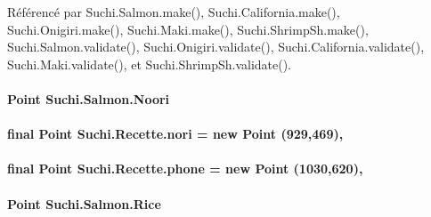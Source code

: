 Référencé par Suchi.\+Salmon.\+make(), Suchi.\+California.\+make(), Suchi.\+Onigiri.\+make(), Suchi.\+Maki.\+make(), Suchi.\+Shrimp\+Sh.\+make(), Suchi.\+Salmon.\+validate(), Suchi.\+Onigiri.\+validate(), Suchi.\+California.\+validate(), Suchi.\+Maki.\+validate(), et Suchi.\+Shrimp\+Sh.\+validate().

\hypertarget{classSuchi_1_1Salmon_a41f02127a7177e0edda113bd3e61e0b5}{}
\paragraph[{Noori}]{\setlength{\rightskip}{0pt plus 5cm}Point Suchi.\+Salmon.\+Noori\hspace{0.3cm}{\ttfamily [package]}}\label{classSuchi_1_1Salmon_a41f02127a7177e0edda113bd3e61e0b5}
\hypertarget{classSuchi_1_1Recette_ab86193f9fe4491190e232c4e7f93bed5}{}
\paragraph[{nori}]{\setlength{\rightskip}{0pt plus 5cm}final Point Suchi.\+Recette.\+nori = new Point (929,469)\hspace{0.3cm}{\ttfamily [protected]}, {\ttfamily [inherited]}}\label{classSuchi_1_1Recette_ab86193f9fe4491190e232c4e7f93bed5}
\hypertarget{classSuchi_1_1Recette_a89465932bd180079526cfc1f8b8af456}{}
\paragraph[{phone}]{\setlength{\rightskip}{0pt plus 5cm}final Point Suchi.\+Recette.\+phone = new Point (1030,620)\hspace{0.3cm}{\ttfamily [protected]}, {\ttfamily [inherited]}}\label{classSuchi_1_1Recette_a89465932bd180079526cfc1f8b8af456}
\hypertarget{classSuchi_1_1Salmon_a192e52f0c52b2f394135717d8c87fddc}{}
\paragraph[{Rice}]{\setlength{\rightskip}{0pt plus 5cm}Point Suchi.\+Salmon.\+Rice\hspace{0.3cm}{\ttfamily [private]}}\label{classSuchi_1_1Salmon_a192e52f0c52b2f394135717d8c87fddc}
\hypertarget{classSuchi_1_1Recette_a36ec8dc3a30b3f1dba74d3aa354f9f11}{}

